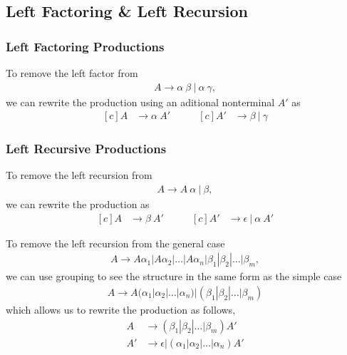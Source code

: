 \subsection{Left Factoring \& Left Recursion}

\subsubsection{Left Factoring Productions}

To remove the left factor from
\begin{align*}
    A \rightarrow \alpha\ \beta\ |\ \alpha\ \gamma,
\end{align*}
we can rewrite the production using an aditional nonterminal $A'$ as
\begin{equation*}
    \begin{aligned}[c]
        A &\rightarrow \alpha\ A'
    \end{aligned}
    \qquad 
    \begin{aligned}[c]
        A' &\rightarrow \beta\ |\ \gamma
    \end{aligned}
\end{equation*}
\subsubsection{Left Recursive Productions}
To remove the left recursion from
\begin{align*}
    A \rightarrow A\ \alpha\ |\ \beta,
\end{align*}
we can rewrite the production as
\begin{equation*}
    \begin{aligned}[c]
        A &\rightarrow \beta\ A'
    \end{aligned}
    \qquad 
    \begin{aligned}[c]
        A' &\rightarrow \epsilon\ |\ \alpha\ A'
    \end{aligned}
\end{equation*}

To remove the left recursion from the general case
\begin{align*}
    A \rightarrow A\alpha_1|A\alpha_2|\dots|A\alpha_n|\beta_1|\beta_2|\dots|\beta_m,
\end{align*}
we can use grouping to see the structure in the same form as the simple case
\begin{align*}
    A \rightarrow A(\alpha_1|\alpha_2|\dots|\alpha_n)|(\beta_1|\beta_2|\dots|\beta_m)
\end{align*}
which allows us to rewrite the production as follows,
\begin{align*}
    A &\rightarrow (\beta_1|\beta_2|\dots|\beta_m)A'\\
    A' &\rightarrow \epsilon|(\alpha_1|\alpha_2|\dots|\alpha_n)A'
\end{align*}

